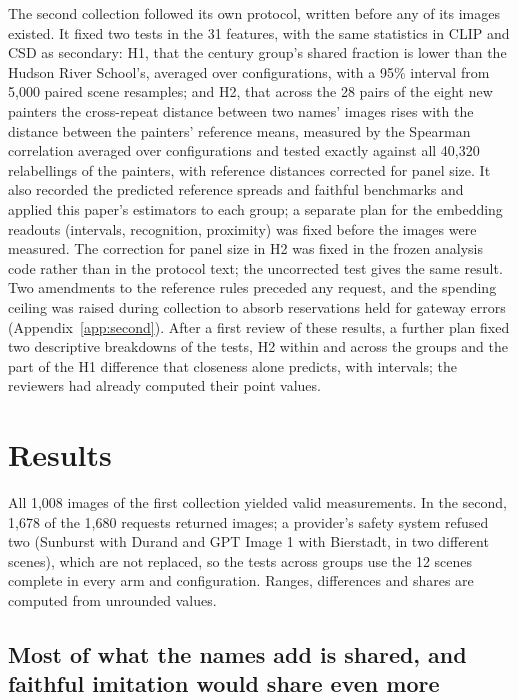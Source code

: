 \documentclass[10pt]{article}
\begin{document}
The second collection followed its own protocol, written before any of its images existed. It
fixed two tests in the 31 features, with the same statistics in CLIP and CSD as secondary: H1,
that the century group's shared fraction is lower than the Hudson River School's, averaged over
configurations, with a 95\% interval from 5,000 paired scene resamples; and H2, that across the 28
pairs of the eight new painters the cross-repeat distance between two names' images rises with the
distance between the painters' reference means, measured by the Spearman correlation averaged over
configurations and tested exactly against all 40,320 relabellings of the painters, with reference
distances corrected for panel size. It also recorded the predicted reference spreads and faithful
benchmarks and applied this paper's estimators to each group; a separate plan for the embedding
readouts (intervals, recognition, proximity) was fixed before the images were measured. The
correction for panel size in H2 was fixed in the frozen analysis code rather than in the protocol
text; the uncorrected test gives the same result. Two amendments to the reference rules preceded
any request, and the spending ceiling was raised during collection to absorb reservations held for
gateway errors (Appendix~\ref{app:second}). After a first review of these results, a further plan
fixed two descriptive breakdowns of the tests, H2 within and across the groups and the part of the
H1 difference that closeness alone predicts, with intervals; the reviewers had already computed
their point values.

\section{Results}\label{sec:results}

All 1,008 images of the first collection yielded valid measurements. In the second, 1,678 of the
1,680 requests returned images; a provider's safety system refused two (Sunburst with Durand and
GPT Image 1 with Bierstadt, in two different scenes), which are not replaced, so the tests across
groups use the 12 scenes complete in every arm and configuration. Ranges, differences and shares
are computed from unrounded values.

\subsection{Most of what the names add is shared, and faithful imitation would share even more}\label{sec:shared}
\end{document}
